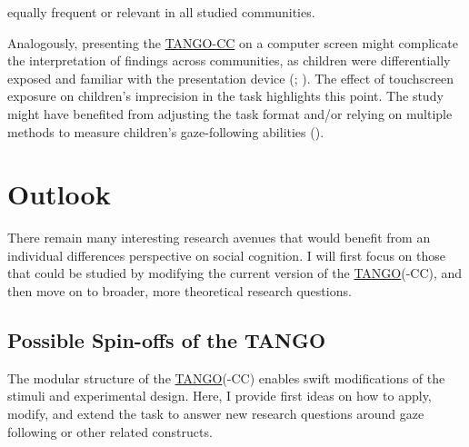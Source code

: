 \documentclass[
]{scrbook}
\begin{document}
equally frequent or relevant in all studied communities.

Analogously, presenting the \hyperref[acronyms_TANGO-CC]{TANGO-CC} on a computer screen might complicate the interpretation of findings across communities, as children were differentially exposed and familiar with the presentation device (; ). The effect of touchscreen exposure on children's imprecision in the task highlights this point. The study might have benefited from adjusting the task format and/or relying on multiple methods to measure children's gaze-following abilities ().

\section{Outlook}\label{outlook}

There remain many interesting research avenues that would benefit from an individual differences perspective on social cognition. I will first focus on those that could be studied by modifying the current version of the \hyperref[acronyms_TANGO]{TANGO}(-CC), and then move on to broader, more theoretical research questions.

\subsection{Possible Spin-offs of the TANGO}\label{outlook-spinoffs}

The modular structure of the \hyperref[acronyms_TANGO]{TANGO}(-CC) enables swift modifications of the stimuli and experimental design. Here, I provide first ideas on how to apply, modify, and extend the task to answer new research questions around gaze following or other related constructs.
\end{document}
